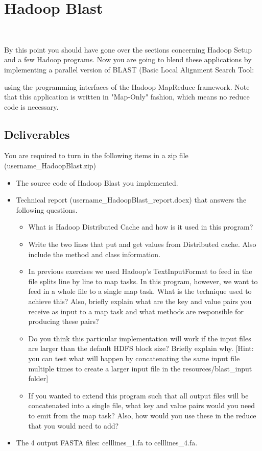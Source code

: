 \section{Hadoop Blast}
\FILENAME\

 
By this point you should have gone over the sections concerning Hadoop Setup
and a few Hadoop programs. Now you are going to blend these applications by
implementing a parallel version of BLAST (Basic Local Alignment Search Tool:


using the programming
interfaces of the Hadoop MapReduce framework. Note that this application is
written in "Map-Only" fashion, which means no reduce code is necessary.

\subsection{Deliverables} 

You are required to turn in the following items in a zip file
(username\_HadoopBlast.zip)

\begin{itemize} 
\item The source code of Hadoop Blast you implemented.
\item	Technical report (username\_HadoopBlast\_report.docx) that answers the
  following questions.

\begin{itemize}
\item What is Hadoop Distributed Cache and how is it used in this program? 
\item Write the two lines that put and get values from Distributed cache. Also
  include the method and class information.

\item In previous exercises we used Hadoop's TextInputFormat to feed in the file
  splits line by line to map tasks. In this program, however, we want to feed
    in a whole file to a single map task. What is the technique used to achieve
    this? Also, briefly explain what are the key and value pairs you receive as
    input to a map task and what methods are responsible for producing these
    pairs?

\item Do you think this particular implementation will work if the input files
  are larger than the default HDFS block size? Briefly explain why. [Hint: you
    can test what will happen by concatenating the same input file multiple
    times to create a larger input file in the resources/blast\_input folder]

\item	If you wanted to extend this program such that all output files will be
  concatenated into a single file, what key and value pairs would you need to
    emit from the map task? Also, how would you use these in the reduce that
    you would need to add?

\end{itemize}
\item	The 4 output FASTA files: celllines\_1.fa to celllines\_4.fa.
\end{itemize}



